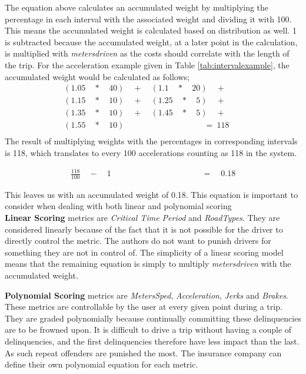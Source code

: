 The equation above calculates an accumulated weight by multiplying the percentage in each interval with the associated weight and dividing it with 100. This means the accumulated weight is calculated based on distribution as well. 1 is subtracted because the accumulated weight, at a later point in the calculation, is multiplied with \textit{metersdriven} as the costs should correlate with the length of the trip. For the acceleration example given in Table \ref{tab:intervalexample}, the accumulated weight would be calculated as follows;
\begin{align*}
(1.05\quad *\quad 40)\quad +\quad (1.1\quad *\quad 20)\quad +\quad \quad \\ 
  (1.15\quad *\quad 10)\quad +\quad (1.25\quad *\quad 5)\quad +\quad \quad \\
  (1.35\quad *\quad 10)\quad +\quad (1.45\quad *\quad 5)\quad +\quad \quad \\
  (1.55\quad *\quad 10)\quad \quad \quad \quad \quad \quad \quad \quad \ \ \ \quad =\ 118 \\
\end{align*}
The result of multiplying weights with the percentages in corresponding intervals is 118, which translates to every 100 accelerations counting as 118 in the system.

\begin{align*}
\frac { 118 }{ 100 } \quad -\quad 1\quad \quad \quad \quad \quad \quad \quad \quad \quad \quad \quad  =\quad 0.18
\end{align*}


This leaves us with an accumulated weight of 0.18. This equation is important to consider when dealing with both linear and polynomial scoring\\

\textbf{Linear Scoring} metrics are \textit{Critical Time Period} and \textit{RoadTypes}. They are considered linearly because of the fact that it is not possible for the driver to directly control the metric. The authors do not want to punish drivers for something they are not in control of. 
The simplicity of a linear scoring model means that the remaining equation is simply to multiply \textit{metersdriven} with the accumulated weight.

\textbf{Polynomial Scoring} metrics are \textit{MetersSped}, \textit{Acceleration}, \textit{Jerks} and \textit{Brakes}. These metrics are controllable by the user at every given point during a trip. They are graded polynomially because continually committing these delinquencies are to be frowned upon. It is difficult to drive a trip without having a couple of delinquencies, and the first delinquencies therefore have less impact than the last. As such repeat offenders are punished the most. The insurance company can define their own polynomial equation for each metric.

